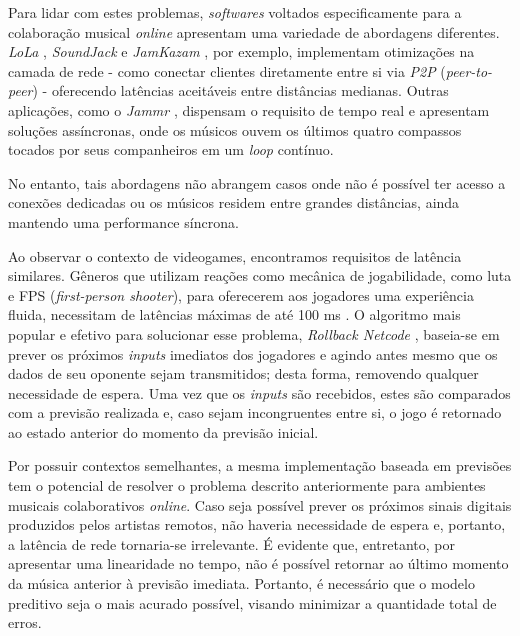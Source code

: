 Para lidar com estes problemas, \textit{softwares} voltados especificamente para a colaboração musical \textit{online} apresentam uma variedade de abordagens diferentes. \textit{LoLa} \cite{lola}, \textit{SoundJack} \cite{soundjack} e \textit{JamKazam} \cite{jamkazam}, por exemplo, implementam otimizações na camada de rede - como conectar clientes diretamente entre si via \textit{P2P} (\textit{peer-to-peer}) - oferecendo latências aceitáveis entre distâncias medianas. Outras aplicações, como o \textit{Jammr} \cite{jammr}, dispensam o requisito de tempo real e apresentam soluções assíncronas, onde os músicos ouvem os últimos quatro compassos tocados por seus companheiros em um \textit{loop} contínuo.

No entanto, tais abordagens não abrangem casos onde não é possível ter acesso a conexões dedicadas ou os músicos residem entre grandes distâncias, ainda mantendo uma performance síncrona.

Ao observar o contexto de videogames, encontramos requisitos de latência similares. Gêneros que utilizam reações como mecânica de jogabilidade, como luta e FPS (\textit{first-person shooter}), para oferecerem aos jogadores uma experiência fluida, necessitam de latências máximas de até 100 ms \cite{pubnub}. O algoritmo mais popular e efetivo para solucionar esse problema, \textit{Rollback Netcode} \cite{rollback}, baseia-se em prever os próximos \textit{inputs} imediatos dos jogadores e agindo antes mesmo que os dados de seu oponente sejam transmitidos; desta forma, removendo qualquer necessidade de espera. Uma vez que os \textit{inputs} são recebidos, estes são comparados com a previsão realizada e, caso sejam incongruentes entre si, o jogo é retornado ao estado anterior do momento da previsão inicial.

Por possuir contextos semelhantes, a mesma implementação baseada em previsões tem o potencial de resolver o problema descrito anteriormente para ambientes musicais colaborativos \textit{online}. Caso seja possível prever os próximos sinais digitais produzidos pelos artistas remotos, não haveria necessidade de espera e, portanto, a latência de rede tornaria-se irrelevante. É  evidente que, entretanto, por apresentar uma linearidade no tempo, não é possível retornar ao último momento da música anterior à previsão imediata. Portanto, é necessário que o modelo preditivo seja o mais acurado possível, visando minimizar a quantidade total de erros.
